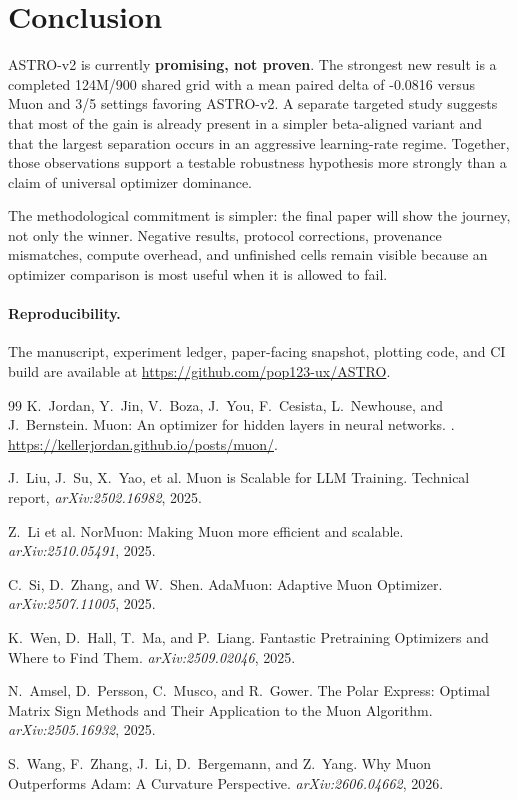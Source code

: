 \documentclass[10pt,twocolumn]{article}
\begin{document}
\section{Conclusion}
ASTRO-v2 is currently \textbf{promising, not proven}. The strongest new result
is a completed 124M/900 shared grid with a mean paired delta of -0.0816 versus
Muon and 3/5 settings favoring ASTRO-v2. A separate targeted study suggests that
most of the gain is already present in a simpler beta-aligned variant and that
the largest separation occurs in an aggressive learning-rate regime. Together,
those observations support a testable robustness hypothesis more strongly than a
claim of universal optimizer dominance.

The methodological commitment is simpler: the final paper will show the journey,
not only the winner. Negative results, protocol corrections, provenance
mismatches, compute overhead, and unfinished cells remain visible because an
optimizer comparison is most useful when it is allowed to fail.

\paragraph{Reproducibility.}
The manuscript, experiment ledger, paper-facing snapshot, plotting code, and CI
build are available at \url{https://github.com/pop123-ux/ASTRO}.

\begin{thebibliography}{99}
K.~Jordan, Y.~Jin, V.~Boza, J.~You, F.~Cesista, L.~Newhouse, and J.~Bernstein.
\newblock Muon: An optimizer for hidden layers in neural networks.
. \url{https://kellerjordan.github.io/posts/muon/}.

J.~Liu, J.~Su, X.~Yao, et al.
\newblock Muon is Scalable for LLM Training.
\newblock Technical report, \emph{arXiv:2502.16982}, 2025.

Z.~Li et al.
\newblock NorMuon: Making Muon more efficient and scalable.
\newblock \emph{arXiv:2510.05491}, 2025.

C.~Si, D.~Zhang, and W.~Shen.
\newblock AdaMuon: Adaptive Muon Optimizer.
\newblock \emph{arXiv:2507.11005}, 2025.

K.~Wen, D.~Hall, T.~Ma, and P.~Liang.
\newblock Fantastic Pretraining Optimizers and Where to Find Them.
\newblock \emph{arXiv:2509.02046}, 2025.

N.~Amsel, D.~Persson, C.~Musco, and R.~Gower.
\newblock The Polar Express: Optimal Matrix Sign Methods and Their Application to
  the Muon Algorithm.
\newblock \emph{arXiv:2505.16932}, 2025.

S.~Wang, F.~Zhang, J.~Li, D.~Bergemann, and Z.~Yang.
\newblock Why Muon Outperforms Adam: A Curvature Perspective.
\newblock \emph{arXiv:2606.04662}, 2026.
\end{thebibliography}
\end{document}
